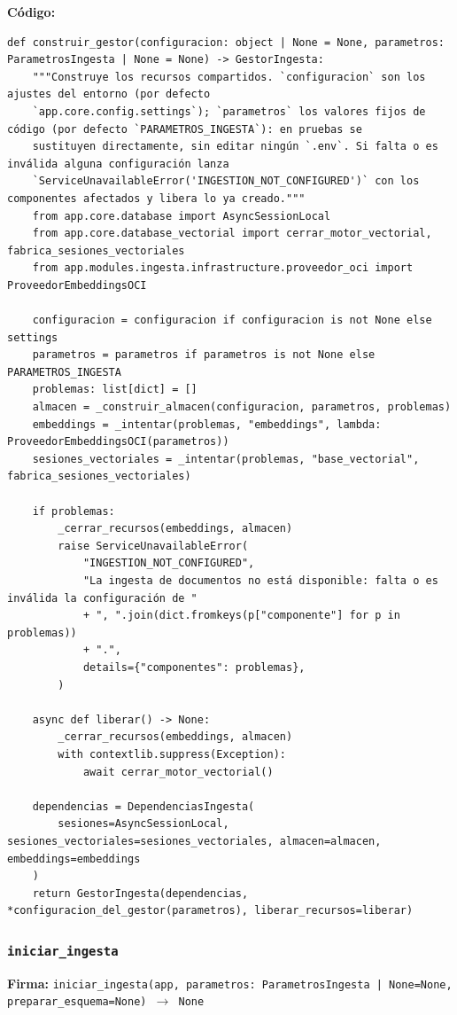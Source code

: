 \documentclass[11pt,a4paper]{article}
\begin{document}
\textbf{Código:}
\begin{lstlisting}
def construir_gestor(configuracion: object | None = None, parametros: ParametrosIngesta | None = None) -> GestorIngesta:
    """Construye los recursos compartidos. `configuracion` son los ajustes del entorno (por defecto
    `app.core.config.settings`); `parametros` los valores fijos de código (por defecto `PARAMETROS_INGESTA`): en pruebas se
    sustituyen directamente, sin editar ningún `.env`. Si falta o es inválida alguna configuración lanza
    `ServiceUnavailableError('INGESTION_NOT_CONFIGURED')` con los componentes afectados y libera lo ya creado."""
    from app.core.database import AsyncSessionLocal
    from app.core.database_vectorial import cerrar_motor_vectorial, fabrica_sesiones_vectoriales
    from app.modules.ingesta.infrastructure.proveedor_oci import ProveedorEmbeddingsOCI

    configuracion = configuracion if configuracion is not None else settings
    parametros = parametros if parametros is not None else PARAMETROS_INGESTA
    problemas: list[dict] = []
    almacen = _construir_almacen(configuracion, parametros, problemas)
    embeddings = _intentar(problemas, "embeddings", lambda: ProveedorEmbeddingsOCI(parametros))
    sesiones_vectoriales = _intentar(problemas, "base_vectorial", fabrica_sesiones_vectoriales)

    if problemas:
        _cerrar_recursos(embeddings, almacen)
        raise ServiceUnavailableError(
            "INGESTION_NOT_CONFIGURED",
            "La ingesta de documentos no está disponible: falta o es inválida la configuración de "
            + ", ".join(dict.fromkeys(p["componente"] for p in problemas))
            + ".",
            details={"componentes": problemas},
        )

    async def liberar() -> None:
        _cerrar_recursos(embeddings, almacen)
        with contextlib.suppress(Exception):
            await cerrar_motor_vectorial()

    dependencias = DependenciasIngesta(
        sesiones=AsyncSessionLocal, sesiones_vectoriales=sesiones_vectoriales, almacen=almacen, embeddings=embeddings
    )
    return GestorIngesta(dependencias, *configuracion_del_gestor(parametros), liberar_recursos=liberar)
\end{lstlisting}

\subsubsection*{\texttt{iniciar\_ingesta}}
\textbf{Firma:} \texttt{iniciar\_ingesta(app, parametros: ParametrosIngesta | None=None, preparar\_esquema=None) $\rightarrow$ None}
\end{document}
